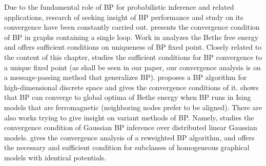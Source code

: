 Due to the fundamental role of BP for probabilistic inference and related applications, research of seeking insight of BP performance and study on its convergence have been constantly carried out. \cite{weiss2000correctness} presents the convergence condition of BP in graphs containing a single loop. Work in \cite{heskes2004uniqueness} analyzes the Bethe free energy and offers sufficient conditions on uniqueness of BP fixed point.
{Closely related to the content of this chapter, \cite{mooij2012sufficient-conditions} studies the sufficient conditions for BP convergence to a unique fixed point (as shall be seen in our paper, our convergence analysis is on a message-passing method that generalizes BP).}
\cite{nima2013stochasticBP} proposes a BP algorithm for high-dimensional discrete space and gives the convergence conditions of it. \cite{frederic2019fast} shows that BP can converge to global optima of Bethe energy when BP runs in Ising models that are ferromagnetic (neighboring nodes prefer to be aligned).
There are also works trying to give insight on variant methods of BP. Namely,
\cite{du2017convergenceBP, malioutov2006walk-sums} studies the convergence condition of Gaussian BP inference over distributed linear Gaussian models. \cite{roosta2008reweighed_sum_product} gives the convergence analysis of a reweighted BP algorithm, and offers the necessary and sufficient condition for subclasses of homogeneous graphical models with identical potentials.



